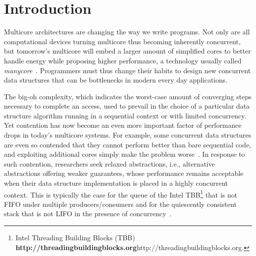 % 
% 
% 
% 

\section{Introduction}

Multicore architectures are changing the way we write programs.
Not only are all computational devices
turning multicore thus becoming inherently concurrent, 
but tomorrow's multicore will embed a larger amount of simplified cores to better handle energy while 
proposing higher performance, a technology usually called \emph{manycore}~\cite{Borkar2007}.
Programmers must thus change their habits to design new concurrent data structures that can be bottlenecks in 
modern every day applications.

The big-oh complexity, which indicates the worst-case amount of converging steps necessary to 
complete an access, used to prevail in the choice of a particular
data structure algorithm running in a sequential context or with limited concurrency.
Yet contention has now become an even more important factor 
of performance drops in today's multicore systems.
For example, some concurrent data structures are even so contended that they cannot perform 
better than bare sequential code, and exploiting additional cores simply make the problem 
worse~\cite{Sha11}.
In response to such contention, researchers seek relaxed abstractions, i.e., alternative 
abstractions offering weaker guarantees, whose performance remains acceptable when their data 
structure implementation is placed in a highly concurrent context. 
This is typically the case for the queue of the 
Intel\textregistered{} TBB\footnote{Intel\textregistered{} Threading Building Blocks (TBB) 
{\bf http://threadingbuildingblocks.org}{http://threadingbuildingblocks.org}.} that is 
not FIFO under multiple producers/consumers and for the quiescently consistent stack
that is not LIFO in the presence of concurrency~\cite{Sha11}.

